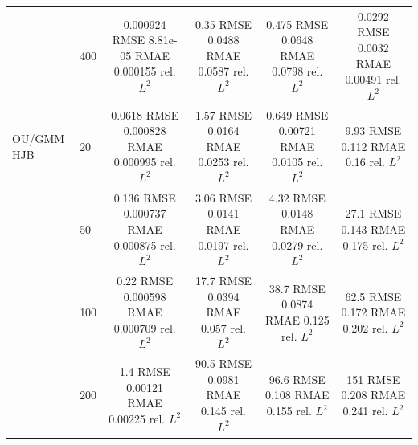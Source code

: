 \begin{tabular}{llcccc}
 & 400 & \shortstack{0.000924 RMSE\\8.81e-05 RMAE\\0.000155 rel. $L^2$} & \shortstack{0.35 RMSE\\0.0488 RMAE\\0.0587 rel. $L^2$} & \shortstack{0.475 RMSE\\0.0648 RMAE\\0.0798 rel. $L^2$} & \shortstack{0.0292 RMSE\\0.0032 RMAE\\0.00491 rel. $L^2$} \\
\addlinespace
OU/GMM HJB & 20 & \shortstack{0.0618 RMSE\\0.000828 RMAE\\0.000995 rel. $L^2$} & \shortstack{1.57 RMSE\\0.0164 RMAE\\0.0253 rel. $L^2$} & \shortstack{0.649 RMSE\\0.00721 RMAE\\0.0105 rel. $L^2$} & \shortstack{9.93 RMSE\\0.112 RMAE\\0.16 rel. $L^2$} \\
 & 50 & \shortstack{0.136 RMSE\\0.000737 RMAE\\0.000875 rel. $L^2$} & \shortstack{3.06 RMSE\\0.0141 RMAE\\0.0197 rel. $L^2$} & \shortstack{4.32 RMSE\\0.0148 RMAE\\0.0279 rel. $L^2$} & \shortstack{27.1 RMSE\\0.143 RMAE\\0.175 rel. $L^2$} \\
 & 100 & \shortstack{0.22 RMSE\\0.000598 RMAE\\0.000709 rel. $L^2$} & \shortstack{17.7 RMSE\\0.0394 RMAE\\0.057 rel. $L^2$} & \shortstack{38.7 RMSE\\0.0874 RMAE\\0.125 rel. $L^2$} & \shortstack{62.5 RMSE\\0.172 RMAE\\0.202 rel. $L^2$} \\
 & 200 & \shortstack{1.4 RMSE\\0.00121 RMAE\\0.00225 rel. $L^2$} & \shortstack{90.5 RMSE\\0.0981 RMAE\\0.145 rel. $L^2$} & \shortstack{96.6 RMSE\\0.108 RMAE\\0.155 rel. $L^2$} & \shortstack{151 RMSE\\0.208 RMAE\\0.241 rel. $L^2$} \\

\end{tabular}
